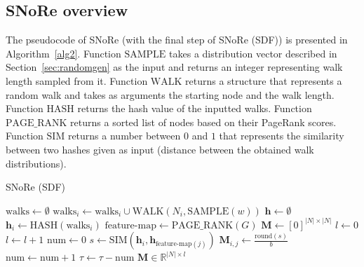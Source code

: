 \documentclass[twoside,11pt]{article}
\begin{document}
\subsection{SNoRe overview}
\label{sec:overview}
The pseudocode of SNoRe (with the final step of SNoRe (SDF)) is presented in Algorithm~\ref{alg2}. Function $\textrm{SAMPLE}$ takes a distribution vector described in Section~\ref{sec:randomgen} as the input and returns an integer representing walk length sampled from it. Function $\textrm{WALK}$ returns a structure that represents a random walk and takes as arguments the starting node and the walk length. Function $\textrm{HASH}$ returns the hash value of the inputted walks. Function $\textrm{PAGE\_RANK}$ returns a sorted list of nodes based on their PageRank scores. Function $\textrm{SIM}$ returns a number between $0$ and $1$ that represents the similarity between two hashes given as input (distance between the obtained walk distributions).

\begin{algorithm}
\caption{SNoRe (SDF)}
\label{alg2}
\SetAlgoLined
{}
\begin{algorithmic}[1]
    \STATE $\textrm{walks} \gets \emptyset$ 
            \STATE $\textrm{walks}_i \gets \textrm{walks}_i \cup \textrm{WALK}(N_i, \textrm{SAMPLE}(w))$
        \ENDFOR
    \ENDFOR   
    \STATE $\boldsymbol{h} \gets \emptyset$ 
        \STATE $\boldsymbol{h}_i \gets \textrm{HASH}(\textrm{walks}_i)$
    \ENDFOR   
    \STATE $\textrm{feature-map} \gets \textrm{PAGE\_RANK}(G)$ 
    \STATE $\boldsymbol{M} \gets [0]^{|N| \times |N|}$
    \STATE $l \gets 0$ 
        \STATE $l \gets l + 1$
        \STATE $\textrm{num} \gets 0$
            \STATE $s \gets \textrm{SIM}(\boldsymbol{h}_i,\boldsymbol{h}_{\textrm{feature-map}(j)})$ 
            \STATE $\boldsymbol{M}_{i,j} \gets \frac{\textrm{round}(s)}{b}$
                \STATE $\textrm{num} \gets \textrm{num} + 1$
            \ENDIF
        \ENDFOR
        \STATE $\tau \gets \tau - \textrm{num}$
    \ENDWHILE
    \RETURN $\boldsymbol{M} \in \mathbb{R}^{|N| \times l}$
\end{algorithmic}
\end{algorithm}
\end{document}

